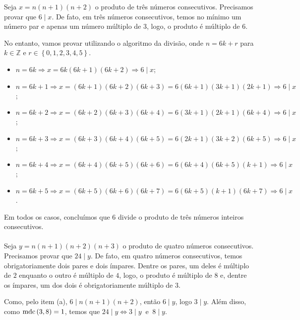 \documentclass[12pt, a4paper]{article}
\newcommand{\mdc}{{\rm mdc}}
\newcommand{\Z}{\mathbb{Z}}
\begin{document}
\begin{solution}
Seja $ x=n \left( n+1 \right)  \left( n+2 \right)$ o produto de três números consecutivos. Precisamos provar que $ 6 \mid x $. De fato, em três números consecutivos, temos no mínimo um número par e apenas um número múltiplo de $3$, logo, o produto é múltiplo de  $6$.

No entanto, vamos provar utilizando o algoritmo da divisão, onde $n=6k+r$ para $k \in \Z$ e $r \in  \left\{ 0,1,2,3,4,5 \right\}$.

\begin{itemize}
	\item  $ n=6k \Rightarrow x=6k \left( 6k+1 \right)  \left( 6k+2 \right)  \Rightarrow 6 \mid x$;
	\item  $n=6k+1 \Rightarrow x= \left( 6k+1 \right)  \left( 6k+2 \right)  \left( 6k+3 \right) =6 \left( 6k+1 \right)  \left( 3k+1 \right)  \left( 2k+1 \right)  \Rightarrow 6 \mid x$;
	\item $n=6k+2 \Rightarrow x= \left( 6k+2 \right)  \left( 6k+3 \right)  \left( 6k+4 \right) =6 \left( 3k+1 \right)  \left( 2k+1 \right)  \left( 6k+4 \right)  \Rightarrow 6 \mid x$;
	\item  $n=6k+3 \Rightarrow x= \left( 6k+3 \right)  \left( 6k+4 \right)  \left( 6k+5 \right) =6 \left( 2k+1 \right)  \left( 3k+2 \right)  \left( 6k+5 \right)  \Rightarrow 6 \mid x$;
	\item  $n=6k+4 \Rightarrow x= \left( 6k+4 \right)  \left( 6k+5 \right)  \left( 6k+6 \right) =6 \left( 6k+4 \right)  \left( 6k+5 \right)  \left( k+1 \right)  \Rightarrow 6 \mid x$;
	\item  $n=6k+5 \Rightarrow x= \left( 6k+5 \right)  \left( 6k+6 \right)  \left( 6k+7 \right) =6 \left( 6k+5 \right)  \left( k+1 \right)  \left( 6k+7 \right)  \Rightarrow 6 \mid x$.
\end{itemize}
Em todos os casos, concluímos que $6$ divide o produto de três números inteiros consecutivos.\\ \\
Seja  $y=n \left( n+1 \right)  \left( n+2 \right)  \left( n+3 \right)$ o produto de quatro números consecutivos. Precisamos provar que $24 \mid y$. De fato, em quatro números consecutivos, temos obrigatoriamente dois pares e dois ímpares. Dentre os pares, um deles é múltiplo de $2$  enquanto o outro é múltiplo de  $4$, logo, o produto é múltiplo de $8$ e, dentre os ímpares, um dos dois é obrigatoriamente múltiplo de $3$.

Como, pelo item (a), $6 \mid n \left( n+1 \right)  \left( n+2 \right)$, então  $6 \mid y$, logo  $3 \mid y$. Além disso, como $\mdc \left( 3,8 \right) =1$, temos que $24 \mid y \Leftrightarrow 3 \mid y\ \mbox{ e } \ 8 \mid y$. 


\end{solution}
\end{document}
